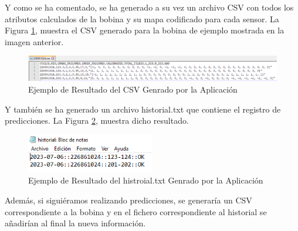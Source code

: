 Y como se ha comentado, se ha generado a su vez un archivo CSV con todos los atributos calculados de la bobina y su mapa codificado para cada sensor. La Figura \ref{f:apli2}, muestra el CSV generado para la bobina de ejemplo mostrada en la imagen anterior. 

\begin{figure}[h]
 \centering
  \includegraphics[width=1\textwidth]{img/csv.PNG}
 \caption{Ejemplo de Resultado del CSV Genrado por la Aplicación}
 \label{f:apli2}
\end{figure}

Y también se ha generado un archivo historial.txt que contiene el registro de predicciones. La Figura \ref{f:apli3}, muestra dicho resultado. 

\begin{figure}[h]
 \centering
  \includegraphics[width=0.5\textwidth]{img/historial.PNG}
 \caption{Ejemplo de Resultado del histroial.txt Genrado por la Aplicación}
 \label{f:apli3}
\end{figure}

Además, si siguiéramos realizando predicciones, se generaría un CSV correspondiente a la bobina y en el fichero correspondiente al historial se añadirían al final la nueva información.